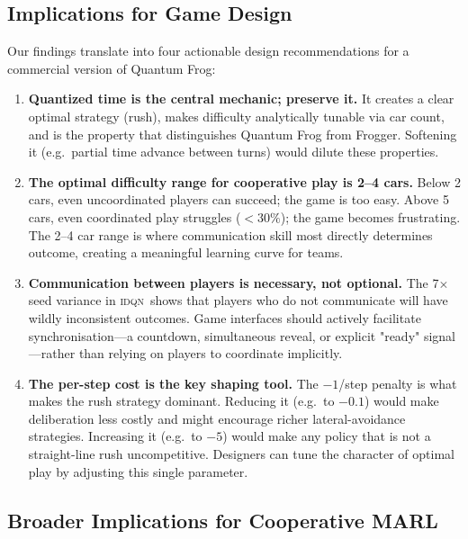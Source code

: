 \documentclass[12pt]{article}
\newcommand{\IDQN}{\textsc{idqn}}
\begin{document}
\subsection{Implications for Game Design}

Our findings translate into four actionable design recommendations for a
commercial version of Quantum Frog:

\begin{enumerate}
  \item \textbf{Quantized time is the central mechanic; preserve it.}
        It creates a clear optimal strategy (rush), makes difficulty analytically
        tunable via car count, and is the property that distinguishes Quantum Frog
        from Frogger.  Softening it (e.g.\ partial time advance between turns)
        would dilute these properties.

  \item \textbf{The optimal difficulty range for cooperative play is 2--4 cars.}
        Below 2 cars, even uncoordinated players can succeed; the game is too
        easy.  Above 5 cars, even coordinated play struggles ($<30\%$); the game
        becomes frustrating.  The 2--4 car range is where communication skill
        most directly determines outcome, creating a meaningful learning curve
        for teams.

  \item \textbf{Communication between players is necessary, not optional.}
        The 7$\times$ seed variance in \IDQN\ shows that players who do not
        communicate will have wildly inconsistent outcomes.  Game interfaces
        should actively facilitate synchronisation—a countdown, simultaneous
        reveal, or explicit "ready" signal—rather than relying on players to
        coordinate implicitly.

  \item \textbf{The per-step cost is the key shaping tool.}
        The $-1$/step penalty is what makes the rush strategy dominant.
        Reducing it (e.g.\ to $-0.1$) would make deliberation less costly
        and might encourage richer lateral-avoidance strategies.  Increasing
        it (e.g.\ to $-5$) would make any policy that is not a straight-line
        rush uncompetitive.  Designers can tune the character of optimal play
        by adjusting this single parameter.
\end{enumerate}

\subsection{Broader Implications for Cooperative MARL}
\end{document}
